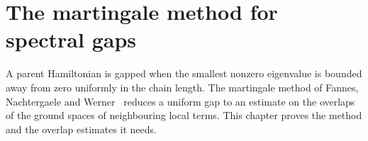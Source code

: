 \chapter{The martingale method for spectral gaps}
\label{ch:parent_hamiltonian_martingale}

A parent Hamiltonian is gapped when the smallest nonzero eigenvalue is bounded
away from zero uniformly in the chain length. The martingale method of Fannes,
Nachtergaele and Werner~\cite{Fannes1992Finitely,Nachtergaele1996Spectral}
reduces a uniform gap to an estimate on the overlaps of the ground spaces of
neighbouring local terms. This chapter proves the method and the overlap
estimates it needs.



